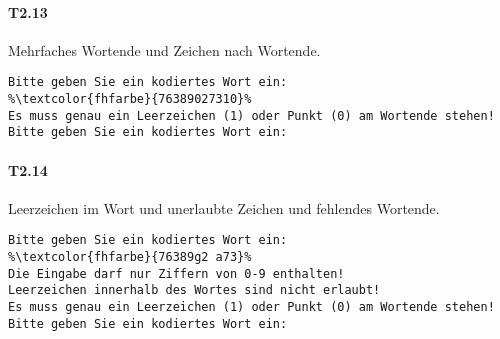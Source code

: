 \paragraph*{T2.13} Mehrfaches Wortende und Zeichen nach Wortende.
\begin{lstlisting}[escapechar=\%]
Bitte geben Sie ein kodiertes Wort ein:
%\textcolor{fhfarbe}{76389027310}%
Es muss genau ein Leerzeichen (1) oder Punkt (0) am Wortende stehen!
Bitte geben Sie ein kodiertes Wort ein:
\end{lstlisting}

\paragraph*{T2.14} Leerzeichen im Wort und unerlaubte Zeichen und fehlendes Wortende.
\begin{lstlisting}[escapechar=\%]
Bitte geben Sie ein kodiertes Wort ein:
%\textcolor{fhfarbe}{76389g2 a73}%
Die Eingabe darf nur Ziffern von 0-9 enthalten!
Leerzeichen innerhalb des Wortes sind nicht erlaubt!
Es muss genau ein Leerzeichen (1) oder Punkt (0) am Wortende stehen!
Bitte geben Sie ein kodiertes Wort ein:
\end{lstlisting}

